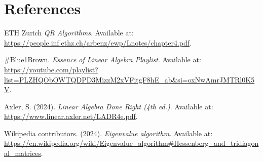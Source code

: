 \documentclass[12pt]{article}
\begin{document}
\section{References}
\begin{thebibliography}{9}

ETH Zurich \textit{QR Algorithms}. Available at: \url{https://people.inf.ethz.ch/arbenz/ewp/Lnotes/chapter4.pdf}.

#Blue1Brown. \textit{Essence of Linear Algebra Playlist}. Available at: \url{https://youtube.com/playlist?list=PLZHQObOWTQDPD3MizzM2xVFitgF8hE_ab&si=oxNwAmrJMTRl0K5V}.

Axler, S. (2024). \textit{Linear Algebra Done Right (4th ed.)}. Available at: \url{https://www.linear.axler.net/LADR4e.pdf}.

Wikipedia contributors. (2024). \textit{Eigenvalue algorithm}. Available at: \url{https://en.wikipedia.org/wiki/Eigenvalue_algorithm#Hessenberg_and_tridiagonal_matrices}.
\end{thebibliography}
\end{document}
